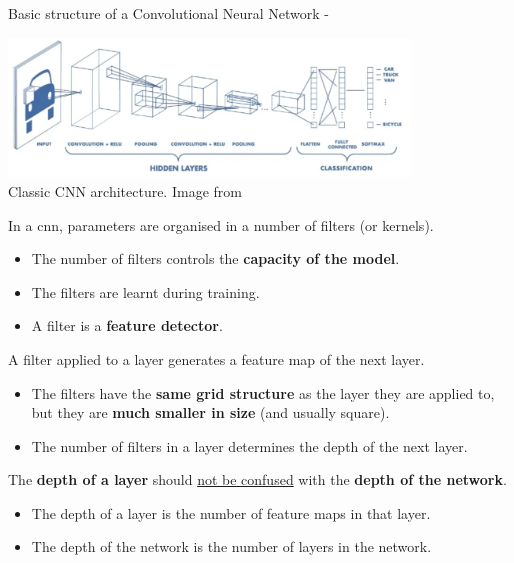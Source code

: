\begin{frame}[t,allowframebreaks]{Basic structure of a Convolutional Neural Network -}
    \begin{center}
        \includegraphics[width=0.8\textwidth]
          {./images/cnn/basic_structure/chatterjee19_classic_cnn_architecture.png}\\
        {\scriptsize 
          Classic CNN architecture.
          \color{col:attribution} 
          Image from \cite{TowardsDataScience:BasicsOfClassicCNN}}\\    
    \end{center}      

    \framebreak

    In a \gls{cnn},
    parameters are organised in a number of 
    \glspl{filter} (or \glspl{kernel}).
    \begin{itemize}
        \item
        The number of \glspl{filter} controls the {\bf capacity of the model}.
        \item 
        The \glspl{filter} are learnt during training.
        \item 
        A \gls{filter} is a {\bf feature detector}.
    \end{itemize}

    \vspace{0.2cm}

    A \gls{filter} applied to a layer generates 
    a \gls{feature map} of the next layer.
    \begin{itemize}
        \item
        The \glspl{filter} have the {\bf same grid structure} as the layer they are applied to,
        but they are {\bf much smaller in size} (and usually square).
        \item
        The number of filters in a layer determines the depth of the next layer.
    \end{itemize}

    \begin{blockexample}{}
        \small
        The {\bf depth of a layer} should \underline{not be confused} 
        with the {\bf depth of the network}.
        \begin{itemize}
          \item The depth of a layer is the number of feature maps in that layer.
          \item The depth of the network is the number of layers in the network.
        \end{itemize}
    \end{blockexample}


\end{frame}

